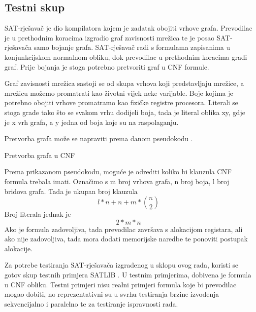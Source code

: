 \documentclass[hidelinks, conference]{IEEEtran}
\begin{document}
\subsection{Testni skup}
SAT-rješavač je dio kompilatora kojem je zadatak obojiti vrhove grafa. Prevodilac je u prethodnim koracima izgradio graf zavisnosti mrežica te je posao SAT-rješavača samo bojanje grafa. SAT-rješavač radi s formulama zapisanima u konjunkcijskom normalnom obliku, dok prevodilac u prethodnim koracima gradi graf. Prije bojanja je stoga potrebno pretvoriti graf u CNF formule.

Graf zavisnosti mrežica sastoji se od skupa vrhova koji predstavljaju mrežice, a mrežicu možemo promatrati kao životni vijek neke varijable. Boje kojima je potrebno obojiti vrhove promatramo kao fizičke registre procesora. Literali se stoga grade tako što se svakom vrhu dodijeli boja, tada je literal oblika xy, gdje je x vrh grafa, a y jedna od boja koje su na raspolaganju. 

Pretvorba grafa može se napraviti prema danom pseudokodu \cite{b4}.

\begin{algorithm}
\caption{Pretvorba grafa u CNF}\label{alg:two}
\end{algorithm}


Prema prikazanom pseudokodu, moguće je odrediti koliko bi klauzula CNF formula trebala imati. Označimo s m broj vrhova grafa, n broj boja, l broj bridova grafa. Tada je ukupan broj klauzula \begin{equation}
    l*n+n+m*\binom{n}{2}
\end{equation} Broj literala jednak je \begin{equation}
    2*m*n
\end{equation} Ako je formula zadovoljiva, tada prevodilac završava s alokacijom registara, ali ako nije zadovoljiva, tada mora dodati memorijske naredbe te ponoviti postupak alokacije.

Za potrebe testiranja SAT-rješavača izgrađenog u sklopu ovog rada, koristi se gotov skup testnih primjera SATLIB \cite{b5}. U testnim primjerima, dobivena je formula u CNF obliku. Testni primjeri nisu realni primjeri formula koje bi prevodilac mogao dobiti, no reprezentativni su u svrhu testiranja brzine izvođenja sekvencijalno i paralelno te za testiranje ispravnosti rada.
\end{document}
